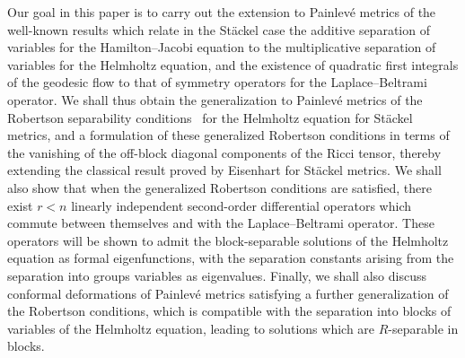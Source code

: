 \documentclass[pdftex]{sigma}
\numberwithin{equation}{section}
\begin{document}
Our goal in this paper is to carry out the extension to Painlev\'e metrics of the well-known results \cite{Ben2016, BCR1-2002,BCR2-2002, Eis1934, KaMi1980, KaMi1981, KaMi1984} which relate in the St\"ackel case the additive separation of variables for the Hamilton--Jacobi equation to the multiplicative separation of variables for the Helmholtz equation, and the existence of quadratic first integrals of the geodesic flow to that of symmetry operators for the Laplace--Beltrami operator. We shall thus obtain the generalization to Painlev\'e metrics of the Robertson separability conditions~\cite{Rob1928} for the Helmholtz equation for St\"ackel metrics, and a formulation of these generalized Robertson conditions in terms of the vanishing of the off-block diagonal components of the Ricci tensor, thereby extending the classical result proved by Eisenhart \cite{Eis1934} for St\"ackel metrics. We shall also show that when the generalized Robertson conditions are satisfied, there exist $r<n$ linearly independent second-order differential operators which commute between themselves and with the Laplace--Beltrami operator. These operators will be shown to admit the block-separable solutions of the Helmholtz equation as formal eigenfunctions, with the separation constants arising from the separation into groups variables as eigenvalues. Finally, we shall also discuss conformal deformations of Painlev\'e metrics satisfying a further generalization of the Robertson conditions, which is compatible with the separation into blocks of variables of the Helmholtz equation, leading to solutions which are $R$-separable in blocks.
\end{document}
